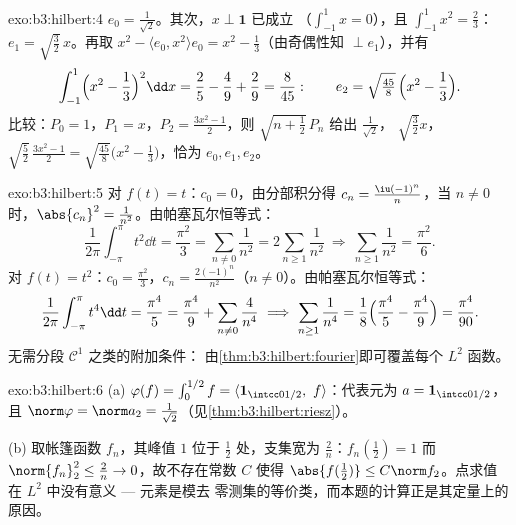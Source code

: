 \begin{solution}{exo:b3:hilbert:4}
$e_0 = \frac1{\sqrt2}$。其次，$x \perp \mathbf 1$ 已成立
（$\int_{-1}^1x = 0$），且 $\int_{-1}^1x^2 = \frac23$：$e_1 =
\sqrt{\tfrac32}\,x$。再取 $x^2 - \langle e_0, x^2\rangle e_0 =
x^2 - \frac13$（由奇偶性知 $\perp e_1$），并有
\[
\int_{-1}^1\Bigl(x^2 - \frac13\Bigr)^2\dd x = \frac25 -
\frac49 + \frac29 = \frac{8}{45}:
\qquad e_2 = \sqrt{\tfrac{45}8}\,\Bigl(x^2 - \frac13\Bigr).
\]
比较：$P_0 = 1$，$P_1 = x$，$P_2 = \frac{3x^2 - 1}2$，则
$\sqrt{n + \tfrac12}\,P_n$ 给出 $\frac1{\sqrt2}$，
$\sqrt{\frac32}x$，$\sqrt{\frac52}\,\frac{3x^2-1}2 =
\sqrt{\frac{45}8}\bigl(x^2 - \frac13\bigr)$，恰为 $e_0, e_1,
e_2$。
\end{solution}

\begin{solution}{exo:b3:hilbert:5}
对 $f(t) = t$：$c_0 = 0$，由分部积分得 $c_n =
\frac{\iu(-1)^n}{n}$，当 $n \neq 0$ 时，$\abs{c_n}^2 =
\frac1{n^2}$。由帕塞瓦尔恒等式：
\[
\frac1{2\pi}\int_{-\pi}^\pi t^2\dd t = \frac{\pi^2}3
= \sum_{n\neq0}\frac1{n^2} = 2\sum_{n\geq1}\frac1{n^2}
\ \Longrightarrow\ \sum_{n\geq1}\frac1{n^2} = \frac{\pi^2}6 .
\]
对 $f(t) = t^2$：$c_0 = \frac{\pi^2}3$，$c_n =
\frac{2(-1)^n}{n^2}$（$n \ne 0$）。由帕塞瓦尔恒等式：
\[
\frac1{2\pi}\int_{-\pi}^{\pi}t^4\dd t = \frac{\pi^4}5
= \frac{\pi^4}9 + \sum_{n\neq0}\frac4{n^4}
\ \Longrightarrow\
\sum_{n\geq1}\frac1{n^4} = \frac18\Bigl(\frac{\pi^4}5 -
\frac{\pi^4}9\Bigr) = \frac{\pi^4}{90} .
\]
无需分段 $\mathcal C^1$ 之类的附加条件：
由\cref{thm:b3:hilbert:fourier}即可覆盖每个 $L^2$ 函数。
\end{solution}

\begin{solution}{exo:b3:hilbert:6}
(a) $\varphi(f) = \int_0^{1/2}f = \langle\mathbf
1_{\intcc0{1/2}},\ f\rangle$：代表元为 $a =
\mathbf 1_{\intcc0{1/2}}$，且 $\norm\varphi = \norm a_2 =
\frac1{\sqrt2}$（见\cref{thm:b3:hilbert:riesz}）。

(b) 取帐篷函数 $f_n$，其峰值 $1$ 位于
$\frac12$ 处，支集宽为 $\frac2n$：$f_n(\tfrac12) = 1$
而 $\norm{f_n}_2^2 \leq \frac2n \to 0$，故不存在常数 $C$
使得 $\abs{f(\frac12)} \leq C\norm f_2$。点求值
在 $L^2$ 中没有意义 --- 元素是模去
零测集的等价类，而本题的计算正是其定量上的原因。
\end{solution}


